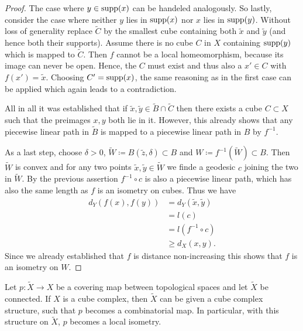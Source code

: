 \begin{proof}
  The case where \(y \in \operatorname{supp}(x)\) can be handeled analogously. So lastly, consider the case where neither \(y\) lies in \(\operatorname{supp}(x)\) nor \(x\) lies in \(\operatorname{supp}(y)\). Without loss of generality replace \(\tilde C\) by the smallest cube containing both \(\tilde x\) and \(\tilde y\) (and hence both their supports). Assume there is no cube \(C\) in \(X\) containing \(\operatorname{supp}(y)\) which is mapped to \(\tilde C\). Then \(f\) cannot be a local homeomorphism, because its image can never be open. Hence, the \(C\) must exist and thus also a \(x' \in C\) with \(f(x') = \tilde x\). Choosing \(C' = \operatorname{supp}(x)\), the same reasoning as in the first case can be applied which again leads to a contradiction.

  All in all it was established that if \(\tilde x, \tilde y \in \tilde B \cap \tilde C\) then there exists a cube \(C \subset X\) such that the preimages \(x, y\) both lie in it. However, this already shows that any piecewise linear path in \(\tilde B\) is mapped to a piecewise linear path in \(B\) by \(f^{-1}\).

  As a last step, choose \(\delta > 0\), \(\tilde W \coloneqq B(\tilde z, \delta) \subset B\) and \(W \coloneqq f^{-1}(\tilde W) \subset B\). Then \(\tilde W\) is convex and for any two points \(\tilde x, \tilde y \in \tilde W\) we finde a geodesic \(c\) joining the two in \(\tilde W\). By the previous assertion \(f^{-1} \circ c\) is also a piecewise linear path, which has also the same length as \(f\) is an isometry on cubes. Thus we have
  \begin{align*}
    d_Y(f(x), f(y))
    & = d_Y(\tilde x, \tilde y)\\
    & = l(c)\\
    & = l(f^{-1} \circ c)\\
    & \geq d_X(x,y).
  \end{align*}
  Since we already established that \(f\) is distance non-increasing this shows that \(f\) is an isometry on \(W\).
\end{proof}

\begin{prop}
  \label{prop:covering}
  Let \(p \colon \tilde X \to X\) be a covering map between topological spaces and let \(\tilde X\) be connected. If \(X\) is a cube complex, then \(\tilde X\) can be given a cube complex structure, such that \(p\) becomes a combinatorial map. In particular, with this structure on \(\tilde X\), \(p\) becomes a local isometry.
\end{prop}

